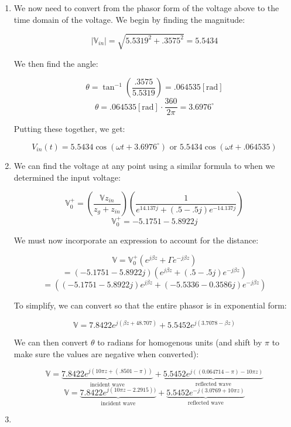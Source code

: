 \begin{enumerate}
\begin{enumerate}
      \item 

        We now need to convert from the phasor form of the voltage above to the time domain of the voltage. We begin by finding the magnitude:

        $$|\mathbb{V}_{in}|=\sqrt{5.5319^2+.3575^2}=5.5434$$

        We then find the angle:

        $$\theta=\tan^{-1}\left(\frac{.3575}{5.5319}\right)=.064535[\text{rad}]$$
        $$\theta=.064535[\text{rad}]\cdot\frac{360}{2\pi}=3.6976^{\circ}$$

        Putting these together, we get:

        $$\boxed{V_{in}(t)=5.5434\cos(\omega t+3.6976^{\circ})\text{ or }5.5434\cos(\omega t+.064535)}$$

      \item 

        We can find the voltage at any point using a similar formula to when we determined the input voltage:

        $$\mathbb{V}_0^+=\left( \frac{\mathbb{V}z_{in}}{z_g+z_{in}} \right)\left( \frac{1}{e^{14.137j}+(.5-.5j)e^{-14.137j}} \right)$$
        $$\mathbb{V}_0^+=-5.1751 - 5.8922j$$

        We must now incorporate an expression to account for the distance:

        $$\mathbb{V}=\mathbb{V}_0^+\left( e^{j\beta z}+\Gamma e^{-j\beta z} \right)$$
        $$=(-5.1751 - 5.8922j)\left( e^{j\beta z}+(.5-.5j)e^{-j\beta z} \right)$$
        $$=\left( (-5.1751 - 5.8922j)e^{j\beta z}+(-5.5336 - 0.3586j)e^{-j\beta z} \right)$$

        To simplify, we can convert so that the entire phasor is in exponential form:

        $$\mathbb{V}=7.8422e^{j(\beta z+48.707)}+5.5452e^{j(3.7078-\beta z)}$$

        We can then convert $\theta$ to radians for homogenous units (and shift by $\pi$ to make sure the values are negative when converted):

        $$\mathbb{V}=\underbrace{7.8422e^{j(10\pi z+(.8501-\pi))}}_{\text{incident wave}}+\underbrace{5.5452e^{j((0.064714-\pi)-10\pi z)}}_{\text{reflected wave}}$$
      $$\boxed{\mathbb{V}=\underbrace{7.8422e^{j(10\pi z-2.2915))}}_{\text{incident wave}}+\underbrace{5.5452e^{-j(3.0769+10\pi z)}}_{\text{reflected wave}}}$$

      \item 


\end{enumerate}
\end{enumerate}
